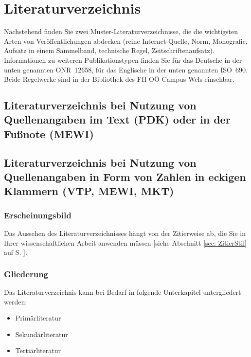 \chapter{Literaturverzeichnis}
\label{sec: Bibliography}
Nachstehend finden Sie zwei Muster-Literaturverzeichnisse, die die wichtigsten Arten von Veröffentlichungen abdecken (reine Internet-Quelle, Norm, Monografie, Aufsatz in einem Sammelband, technische Regel, Zeitschriftenaufsatz). Informationen zu weiteren Publikationstypen finden Sie für das Deutsche in der unten genannten ONR~12658, für das Englische in der unten genannten ISO~690. Beide Regelwerke sind in der Bibliothek des FH-OÖ-Campus Wels einsehbar.

\section{Literaturverzeichnis bei Nutzung von Quellenangaben im Text (PDK) oder in der Fußnote (MEWI)}
\printbibliography[heading=none,env=bibliographyAlpha]
\nocite{*}

\section{Literaturverzeichnis bei Nutzung von Quellenangaben in Form von Zahlen in eckigen Klammern (VTP, MEWI, MKT)}
\printbibliography[heading=none]

\newpage
\subsection*{Erscheinungsbild}
Das Aussehen des Literaturverzeichnisses hängt von der Zitierweise ab, die Sie in Ihrer wissenschaftlichen Arbeit anwenden müssen [siehe Abschnitt \ref{sec: ZitierStil} auf S. \pageref{sec: ZitierStil}].

\subsection*{Gliederung}
Das Literaturverzeichnis kann bei Bedarf in folgende Unterkapitel untergliedert werden:
\begin{itemize}
	\item	Primärliteratur 
	\item	Sekundärliteratur 
	\item	Tertiärliteratur
\end{itemize}

